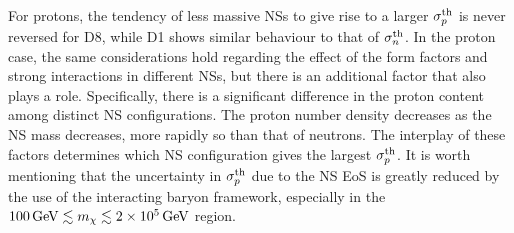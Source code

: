 For protons, the tendency of less massive NSs to give rise to a larger $\sigma^\mathrm{th}_p$ is never reversed for D8, while D1 shows similar behaviour to that of $\sigma^\mathrm{th}_n$. In the proton case, the same considerations hold regarding the effect of the form factors and strong interactions in different NSs, but there is an additional factor that also plays a role. Specifically, there is a significant difference in the proton content among distinct NS configurations. The proton number density decreases as the NS mass decreases, more rapidly so than that of neutrons. The interplay of these factors determines which NS configuration gives the largest $\sigma^\mathrm{th}_p$. It is worth mentioning that the uncertainty in $\sigma^\mathrm{th}_p$ due to the NS EoS is greatly reduced by the use of the interacting baryon framework, especially in the $100{\rm \,GeV}\lesssim m_\chi\lesssim2\times10^5{\rm \,GeV}$ region. 


